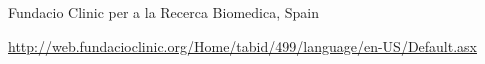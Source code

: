 Fundacio Clinic per a la Recerca Biomedica, Spain

\url{http://web.fundacioclinic.org/Home/tabid/499/language/en-US/Default.asx}

